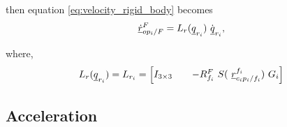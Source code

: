 then equation \eqref{eq:velocity_rigid_body} becomes
\begin{equation}
    \pvec{\dot{r}}{op_{i}}{F}{F} = L_{r}(\vecd{q}_{r_{i}}) \ \dot{\vecd{q}}_{r_{i}},
    \label{velocity_rigid_body_matrix}
\end{equation}

where,
\begin{equation}
    L_{r}(\vecd{q}_{r_{i}}) = L_{r_i} = \begin{bmatrix}
    I_{3 \times 3} && -\rot{R}{f_{i}}{F} \ S( \ \pvec{r}{c_{i}p_{i}}{f_i}{f_i})\ G_{i}         
    \label{eq:lamda_mat_rigid_body}
    \end{bmatrix}
\end{equation}

\subsection{Acceleration}


    
    


